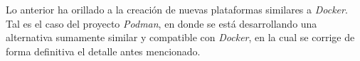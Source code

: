 \documentclass[12pt, letterpaper]{article}
\begin{document}
Lo anterior ha orillado a la creación de nuevas plataformas similares a 
\textit{Docker}. Tal es el caso del proyecto \textit{Podman}, en donde se está 
desarrollando una alternativa sumamente similar y compatible con 
\textit{Docker}, en la cual se corrige de forma definitiva el detalle antes 
mencionado.
\end{document}
